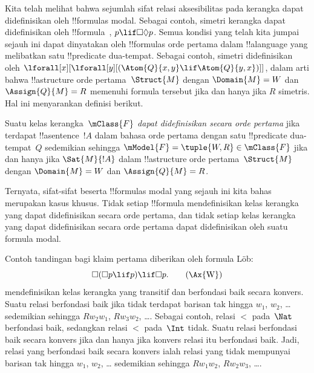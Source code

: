 \documentclass[../../../include/open-logic-section]{subfiles}
\begin{document}


Kita telah melihat bahwa sejumlah sifat relasi aksesibilitas pada kerangka
dapat didefinisikan oleh !!{formula}s modal. Sebagai contoh, simetri kerangka
dapat didefinisikan oleh !!{formula}~, $p \lif \Box\Diamond p$.
Semua kondisi yang telah kita jumpai sejauh ini dapat dinyatakan oleh
!!{formula}s orde pertama dalam !!a{language} yang melibatkan satu
!!{predicate} dua-tempat. Sebagai contoh, simetri didefinisikan oleh
$\lforall[x][\lforall[y][(\Atom{Q}{x,y} \lif \Atom{Q}{y, x})]]$, dalam arti
bahwa !!a{structure} orde pertama~$\Struct{M}$ dengan $\Domain{M}=W$ dan
$\Assign{Q}{M}=R$ memenuhi formula tersebut jika dan hanya jika $R$ simetris.
Hal ini menyarankan definisi berikut.

\begin{defn}
  Suatu kelas kerangka~$\mClass{F}$ \emph{dapat didefinisikan secara orde
  pertama} jika terdapat !!a{sentence}~$!A$ dalam bahasa orde pertama dengan
  satu !!{predicate} dua-tempat~$Q$ sedemikian sehingga
  $\mModel{F}=\tuple{W,R}\in\mClass{F}$ jika dan hanya jika
  $\Sat{M}{!A}$ dalam !!a{structure} orde pertama~$\Struct{M}$ dengan
  $\Domain{M}=W$ dan $\Assign{Q}{M}=R$.
\end{defn}

Ternyata, sifat-sifat beserta !!{formula}s modal yang sejauh ini kita bahas
merupakan kasus khusus. Tidak setiap !!{formula} mendefinisikan kelas kerangka
yang dapat didefinisikan secara orde pertama, dan tidak setiap kelas kerangka
yang dapat didefinisikan secara orde pertama dapat didefinisikan oleh suatu
formula modal.

Contoh tandingan bagi klaim pertama diberikan oleh formula L\"ob:
\begin{equation}
\Box(\Box p \lif p) \lif \Box p. \tag{\Ax{W}}
\end{equation}
 mendefinisikan kelas kerangka yang transitif dan berfondasi baik secara
konvers. Suatu relasi berfondasi baik jika tidak terdapat barisan tak hingga
$w_1$, $w_2$, \dots{} sedemikian sehingga $Rw_2w_1$, $Rw_3w_2$, \dots.
Sebagai contoh, relasi $<$ pada~$\Nat$ berfondasi baik, sedangkan relasi $<$
pada~$\Int$ tidak. Suatu relasi berfondasi baik secara konvers jika dan hanya
jika konvers relasi itu berfondasi baik. Jadi, relasi yang berfondasi baik
secara konvers ialah relasi yang tidak mempunyai barisan tak hingga $w_1$,
$w_2$, \dots{} sedemikian sehingga $Rw_1w_2$, $Rw_2w_3$, \dots.
\end{document}
